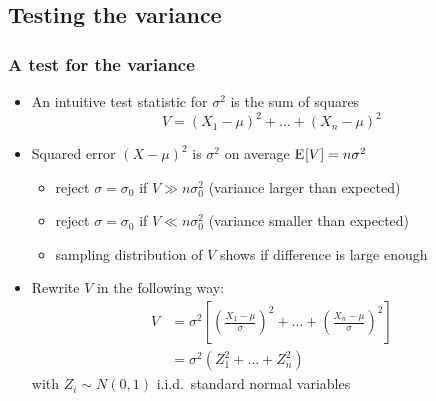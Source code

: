 \documentclass[handout,notes=show,t]{beamer} %
\begin{document}
\subsection{Testing the variance}

\begin{frame}
  \frametitle{A test for the variance}

  \begin{itemize}
  \item An intuitive test statistic for $\sigma^2$ is the sum of squares
    \[
    V = (X_1 - \mu)^2 + \dots + (X_n - \mu)^2
    \]
  \item Squared error $(X - \mu)^2$ is $\sigma^2$ on average \so
    $\mathrm{E}_{}[V] = n \sigma^2$
    \begin{itemize}
    \item reject $\sigma = \sigma_0$ if $V\gg n \sigma^2_0$ (variance larger than expected)
    \item reject $\sigma = \sigma_0$ if $V\ll n \sigma^2_0$ (variance smaller than expected)
    \item[\hand] sampling distribution of $V$ shows if difference is large
      enough
    \end{itemize}
    \pause
  \item Rewrite $V$ in the following way:
    \begin{align*}
      V &= \sigma^2 \left[
        \left( \frac{X_1 - \mu}{\sigma} \right)^2 + \dots 
        + \left( \frac{X_n - \mu}{\sigma} \right)^2
      \right] \\
      &= \sigma^2 (Z_1^2 + \dots + Z_n^2)
    \end{align*}
    with $Z_i\sim N(0,1)$ i.i.d.\ standard normal variables
  \end{itemize}
\end{frame}
\end{document}
